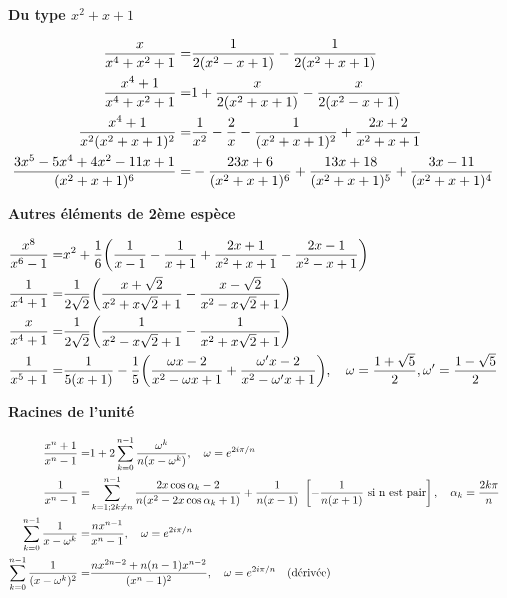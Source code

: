 {{\bigskip

\textbf{Du type $x^2+x+1$}

\begin{align*}
\FFF x/x^4+x^2+1         =& \FFF 1/2(x^2-x+1) - \FFF 1/2(x^2+x+1) \cr
\FFF x^4+1/x^4+x^2+1     =& 1 + \FFF x/2(x^2+x+1) - \FFF x/2(x^2-x+1) \cr
\FFF x^4+1/x^2\DDD2       = & \FFF1/x^2 -\FFF2/x -\FFF1/\DDD2 + \FFF2x+2/{{x^2+x+1}} \cr
\FFF 3x^5-5x^4+4x^2-11x+1/\DDD6  =& -\FFF 23x+6/\DDD6 + \FFF 13x+18/\DDD5 + \FFF 3x-11/\DDD4 \cr
\end{align*}

\bigskip

\textbf{Autres {\'e}l{\'e}ments de 2{\`e}me esp{\`e}ce}

\begin{align*}
\FFF x^8/x^6-1  =& x^2 + \FFF1/6 \biggl( \FFF1/x-1 -\FFF1/x+1 +\FFF2x+1/x^2+x+1 -\FFF2x-1/x^2-x+1 \biggr) \cr
\FFF 1/x^4+1   =& \FFF1/2\sqrt2  \biggl( \FFF x+\sqrt2/x^2+x\sqrt2+1 - \FFF x-\sqrt2/x^2-x\sqrt2+1 \biggr) \cr
\FFF x/x^4+1   =& \FFF 1/2\sqrt2 \biggl( \FFF 1/x^2-x\sqrt2+1 - \FFF 1/x^2+x\sqrt2+1 \biggr) \cr
\FFF 1/x^5+1   =& \FFF 1/5({x+1}) - \FFF1/5 \biggl( \FFF {\omega x-2}/{x^2-\omega x+1}
                   + \FFF {\omega'x-2}/{x^2-\omega'x+1} \biggr),\quad
                   \omega = \FFF1+\sqrt5/2 ,\omega' = \FFF1-\sqrt5/2 \cr
\end{align*}

\bigskip

\textbf{Racines de l'unit{\'e}}

\begin{align*}
\FFF x^n+1/x^n-1         =& 1 + 2\sum_{k=0}^{n-1} \FFF \omega^k/n(x-\omega^k) ,\quad \omega = e^{2i\pi/n}\cr
\FFF 1/x^n-1             =& \sum_{k=1 ; 2k \ne n}^{n-1} \FFF 2x\cos\alpha_k-2/n(x^2-2x\cos\alpha_k+1)
                            + \FFF1/n(x-1) \ \left[ - \FFF1/n(x+1) \text{ si n est pair} \right],
                            \quad \alpha_k = \FFF2k\pi/n \cr
\sum_{k=0}^{n-1} \FFF 1/x-\omega^k        =& \FFF nx^{n-1}/x^n-1 ,\quad \omega = e^{2i\pi/n}\cr
\sum_{k=0}^{n-1} \FFF 1/(x-\omega^k)^2    =& \FFF nx^{2n-2}+n(n-1)x^{n-2}/(x^n-1)^2
                                             ,\quad \omega = e^{2i\pi/n}\quad(\text{d{\'e}riv{\'e}e})\cr
\end{align*}

}}
